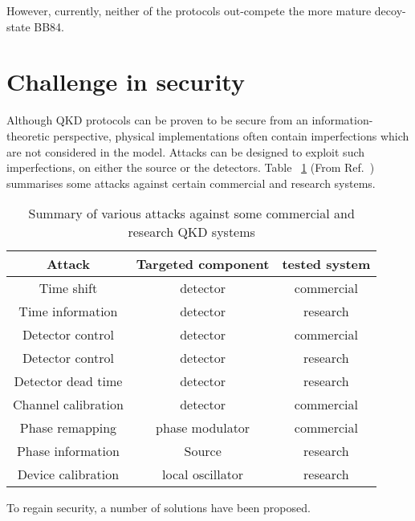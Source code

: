 However, currently, neither of the protocols out-compete the more mature decoy-state BB84.

\section{Challenge in security}
Although QKD protocols can be proven to be secure from an information-theoretic perspective, physical implementations often contain imperfections which are not considered in the model. Attacks can be designed to exploit such imperfections, on either the source or the detectors.
% 
Table ~\ref{attacks} (From Ref.~\cite{lo2014secure}) summarises some attacks against certain commercial and research systems.

\begin{table}
\begin{tabular}{ |c|c|c| } 
 \hline
 Attack &  Targeted component & tested system\\ 
  \hline
Time shift\cite{qi2005time,PhysRevA.78.042333,PhysRevA.74.022313}
        & detector & commercial \\
Time information\cite{lamas2007breaking}  & detector & research \\
Detector control \cite{lydersen2010hacking,yuan2010avoiding}  & detector  &   commercial \\
Detector control \cite{gerhardt2011full}    & detector  & research  \\
Detector dead time\cite{weier2011quantum}     & detector  & research         \\
Channel calibration\cite{jain2011device}    & detector  &  commercial        \\
Phase remapping\cite{xu2010experimental} &  phase modulator & commercial \\
Phase information\cite{tang2013source} & Source & research           \\
Device calibration\cite{jouguet2013preventing} & local oscillator & research \\
                \hline
\end{tabular}
\caption{\label{attacks} Summary of various attacks against some commercial and 
research QKD systems}
\end{table}


To regain security, a number of solutions have been proposed. 

